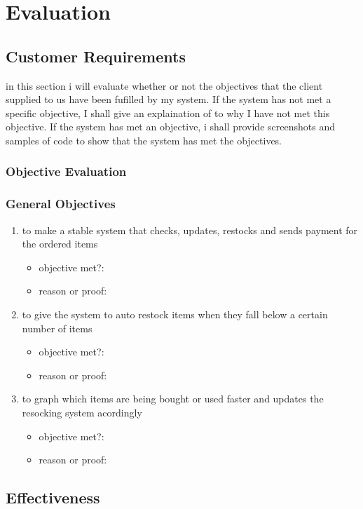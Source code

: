 \chapter{Evaluation}
\section{Customer Requirements}
in this section i will evaluate whether or not the objectives that the client supplied to us have been fufilled by my system. If the system has not met a specific objective, I shall give an explaination of to why I have not met this objective. If the system has met an objective, i shall provide screenshots and samples of code to show that the system has met the objectives. 
\subsection{Objective Evaluation}

\subsection{General Objectives}
\begin{enumerate}
	\item to make a stable system that checks, updates, restocks and sends payment for the ordered items
	\begin{itemize}
		\item objective met?:
		\item reason or proof:
	\end{itemize}
	\item to give the system to auto restock items when they fall below a certain number of items
	\begin{itemize}
		\item objective met?:
		\item reason or proof:
	\end{itemize}
	\item to graph which items are being bought or used faster and updates the resocking system acordingly 
	\begin{itemize}
		\item objective met?:
		\item reason or proof:
	\end{itemize}
\end{enumerate}
\section{Effectiveness}

